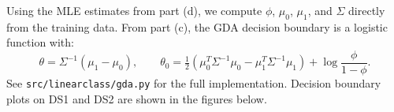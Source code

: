 \begin{answer}
Using the MLE estimates from part (d), we compute $\phi$, $\mu_0$, $\mu_1$, and $\Sigma$ directly from the training data. From part (c), the GDA decision boundary is a logistic function with:
\[
\theta = \Sigma^{-1}(\mu_1 - \mu_0), \qquad
\theta_0 = \tfrac{1}{2}(\mu_0^T\Sigma^{-1}\mu_0 - \mu_1^T\Sigma^{-1}\mu_1) + \log\frac{\phi}{1-\phi}.
\]
See \texttt{src/linearclass/gda.py} for the full implementation. Decision boundary plots on DS1 and DS2 are shown in the figures below.
\end{answer}
